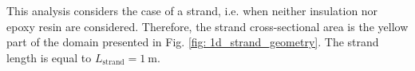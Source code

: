 
This analysis considers the case of a strand, i.e. when neither insulation nor epoxy resin are considered. Therefore, the strand cross-sectional area is the yellow part of the domain presented in Fig. \ref{fig: 1d_strand_geometry}. The strand length is equal to $L_\text{strand}=1~\text{m}$.